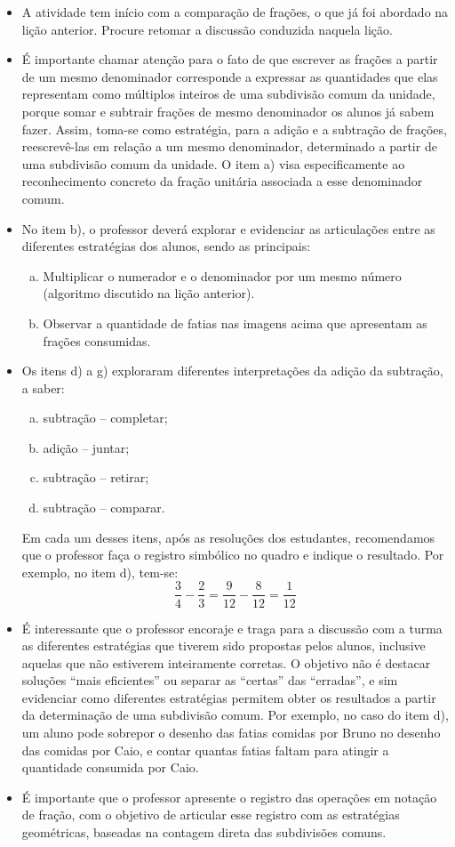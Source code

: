 \begin{multicols}{2}
\begin{itemize}
   \item  A atividade tem início com a comparação de frações, o que já foi abordado na lição anterior. Procure retomar a discussão conduzida naquela lição.
   \item  É importante chamar atenção para o fato de que escrever as frações a partir de um mesmo denominador corresponde a expressar as quantidades que elas representam como múltiplos inteiros de uma subdivisão comum da unidade, porque somar e subtrair frações de mesmo denominador os alunos já sabem fazer. Assim, toma-se como estratégia, para a adição e a subtração de frações, reescrevê-las em relação a um mesmo denominador, determinado a partir de uma subdivisão comum da unidade. O item a) visa especificamente ao reconhecimento concreto da fração unitária associada a esse denominador comum.
   \item  No item b), o professor deverá explorar e evidenciar as articulações entre as diferentes estratégias dos alunos, sendo as principais:
   \begin{enumerate}[a)]
   \item  Multiplicar o numerador e o denominador por um mesmo número (algoritmo discutido na lição anterior).
   \item  Observar a quantidade de fatias nas imagens acima que apresentam as frações consumidas.
   \end{enumerate}
   \item  Os itens d) a g) exploraram diferentes interpretações da adição da subtração, a saber:
   \begin{enumerate}[a)]
\item subtração – completar;
\item adição – juntar;
\item subtração – retirar;
\item subtração – comparar.
   \end{enumerate}

Em cada um desses itens, após as resoluções dos estudantes, recomendamos que o professor faça o registro simbólico no quadro e indique o resultado. Por exemplo, no item d), tem-se:
$$\frac{3}{4} - \frac{2}{3} = \frac{9}{12} - \frac{8}{12}=\frac{1}{12}$$
  \item   É interessante que o professor encoraje e traga para a discussão com a turma as diferentes estratégias que tiverem sido propostas pelos alunos, inclusive aquelas que não estiverem inteiramente corretas. O objetivo não é destacar soluções ``mais eficientes'' ou separar as ``certas'' das ``erradas'', e sim evidenciar como diferentes estratégias permitem obter os resultados a partir da determinação de uma subdivisão comum. Por exemplo, no caso do item d), um aluno pode sobrepor o desenho das fatias comidas por Bruno no desenho das comidas por Caio, e contar quantas fatias faltam para atingir a quantidade consumida por Caio.
  \item  É importante que o professor apresente o registro das operações em notação de fração, com o objetivo de articular esse registro com as estratégias geométricas, baseadas na contagem direta das subdivisões comuns.


\end{itemize}
\end{multicols}
